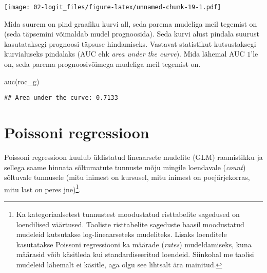 \documentclass[
]{book}
\newenvironment{Shaded}{\begin{snugshade}}{\end{snugshade}}
\newcommand{\AttributeTok}[1]{\textcolor[rgb]{0.77,0.63,0.00}{#1}}
\newcommand{\FunctionTok}[1]{\textcolor[rgb]{0.00,0.00,0.00}{#1}}
\newcommand{\NormalTok}[1]{#1}
\newcommand{\OtherTok}[1]{\textcolor[rgb]{0.56,0.35,0.01}{#1}}
\newcommand{\SpecialCharTok}[1]{\textcolor[rgb]{0.00,0.00,0.00}{#1}}
\newcommand{\StringTok}[1]{\textcolor[rgb]{0.31,0.60,0.02}{#1}}
\begin{document}
\begin{Shaded}
\end{Shaded}

\texttt{[image: 02-logit\_files/figure-latex/unnamed-chunk-19-1.pdf]}

Mida suurem on pind graafiku kurvi all, seda parema mudeliga meil tegemist on (seda täpsemini võimaldab mudel prognoosida). Seda kurvi alust pindala suurust kasutataksegi prognoosi täpsuse hindamiseks. Vastavat statistikut kutsustaksegi kurvialuseks pindalaks (AUC ehk \emph{area under the curve}). Mida lähemal AUC \(1\)'le on, seda parema prognoosivõimega mudeliga meil tegemist on.

\begin{Shaded}
\begin{Highlighting}[]
\FunctionTok{auc}\NormalTok{(roc\_g)}
\end{Highlighting}
\end{Shaded}

\begin{verbatim}
## Area under the curve: 0.7133
\end{verbatim}

\hypertarget{poissoni-regressioon}{%
\chapter{Poissoni regressioon}\label{poissoni-regressioon}}

Poissoni regressioon kuulub üldistatud lineaarsete mudelite (GLM) raamistikku ja sellega saame hinnata sõltumatute tunnuste mõju mingile loendavale (\emph{count}) sõltuvale tunnusele (mitu inimest on kursusel, mitu inimest on poejärjekorras, mitu last on peres jne)\footnote{Ka kategoriaalsetest tunnustest moodustatud risttabelite sagedused on loendilised väärtused. Taoliste risttabelite sageduste baasil moodustatud mudeleid kutsutakse log-lineaarseteks mudeliteks. Lisaks loenditele kasutatakse Poissoni regressiooni ka määrade (\emph{rates}) mudeldamiseks, kuna määrasid võib käsitleda kui standardiseeritud loendeid. Siinkohal me taolisi mudeleid lähemalt ei käsitle, aga olgu see lihtsalt ära mainitud.}.
\end{document}
